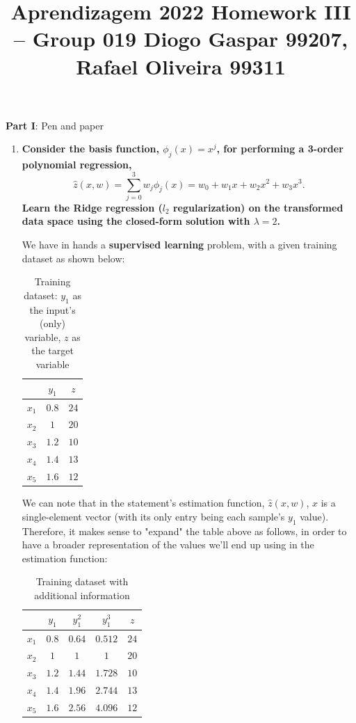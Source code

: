 \documentclass[12pt]{article}
\title{\large{Aprendizagem 2022}\vskip 0.2cm Homework III -- Group 019\vskip 0.2cm Diogo Gaspar 99207, Rafael Oliveira 99311}
\date{}
\begin{document}
\maketitle
\center\large{\vskip -2.5cm\textbf{Part I}: Pen and paper}
\begin{enumerate}[leftmargin=\labelsep]

  \item \textbf{Consider the basis function, $\phi_j(x) = x^j$, for performing a 3-order polynomial regression,
          $$
            \hat{z}(x, w) = \sum_{j=0}^3 w_j \phi_j(x) = w_0 + w_1 x + w_2 x^2 + w_3 x^3.
          $$
          Learn the Ridge regression ($l_2$ regularization) on the transformed data space
          using the closed-form solution with $\lambda = 2$.
        }

        We have in hands a \textbf{supervised learning} problem, with a given training
        dataset as shown below:

        \begin{table}[h]
          \centering
          \begin{tabular}{c|c|c}
                  & $y_1$ & $z$  \\ \hline
            $x_1$ & $0.8$ & $24$ \\
            $x_2$ & $1$   & $20$ \\
            $x_3$ & $1.2$ & $10$ \\
            $x_4$ & $1.4$ & $13$ \\
            $x_5$ & $1.6$ & $12$
          \end{tabular}
          \caption{Training dataset: $y_1$ as the input's (only) variable, $z$ as the target variable}
          \label{tab:training-dataset}
        \end{table}

        We can note that in the statement's estimation function, $\hat{z}(x, w)$, $x$ is a single-element vector
        (with its only entry being each sample's $y_1$ value). Therefore, it makes
        sense to "expand" the table above as follows, in order to have a broader
        representation of the values we'll end up using in the estimation function:

        \begin{table}[h]
          \centering
          \begin{tabular}{c|ccc|c}
                  & $y_1$ & $y_1^2$ & $y_1^3$ & $z$  \\ \hline
            $x_1$ & $0.8$ & $0.64$  & $0.512$ & $24$ \\
            $x_2$ & $1$   & $1$     & $1$     & $20$ \\
            $x_3$ & $1.2$ & $1.44$  & $1.728$ & $10$ \\
            $x_4$ & $1.4$ & $1.96$  & $2.744$ & $13$ \\
            $x_5$ & $1.6$ & $2.56$  & $4.096$ & $12$
          \end{tabular}
          \caption{Training dataset with additional information}
          \label{tab:expanded-training-dataset}
        \end{table}


\end{enumerate}
\end{document}
